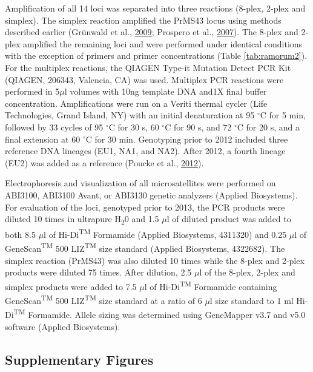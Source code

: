 \documentclass[double,12pt]{beavtex}
\begin{document}
  Amplification of all 14 loci was separated into three reactions (8-plex,
  2-plex and simplex). The simplex reaction amplified the PrMS43 locus
  using methods described earlier (Grünwald et al.,
  \protect\hyperlink{ref-grunwald2009standardizing}{2009}; Prospero et
  al., \protect\hyperlink{ref-prospero2007population}{2007}). The 8-plex
  and 2-plex amplified the remaining loci and were performed under
  identical conditions with the exception of primers and primer
  concentrations (Table \ref{tab:ramorum2}). For the multiplex reactions,
  the QIAGEN Type-it Mutation Detect PCR Kit (QIAGEN, 206343, Valencia,
  CA) was used. Multiplex PCR reactions were performed in 5\(\mu\)l
  volumes with 10ng template DNA and1X final buffer concentration.
  Amplifications were run on a Veriti thermal cycler (Life Technologies,
  Grand Island, NY) with an initial denaturation at 95 \(^{\circ}\)C for 5
  min, followed by 33 cycles of 95 \(^{\circ}\)C for 30 s, 60
  \(^{\circ}\)C for 90 s, and 72 \(^{\circ}\)C for 20 s, and a final
  extension at 60 \(^{\circ}\)C for 30 min. Genotyping prior to 2012
  included three reference DNA lineages (EU1, NA1, and NA2). After 2012, a
  fourth lineage (EU2) was added as a reference (Poucke et al.,
  \protect\hyperlink{ref-vanpoucke2012discovery}{2012}).
  
  Electrophoresis and visualization of all microsatellites were performed
  on ABI3100, ABI3100 Avant, or ABI3130 genetic analyzers (Applied
  Biosystems). For evaluation of the loci, genotyped prior to 2013, the
  PCR products were diluted 10 times in ultrapure H\textsubscript{2}0 and
  1.5 \(\mu\)l of diluted product was added to both 8.5 \(\mu\)l of
  Hi-Di\textsuperscript{TM} Formamide (Applied Biosystems, 4311320) and
  0.25 \(\mu\)l of GeneScan\textsuperscript{TM} 500
  LIZ\textsuperscript{TM} size standard (Applied Biosystems, 4322682). The
  simplex reaction (PrMS43) was also diluted 10 times while the 8-plex and
  2-plex products were diluted 75 times. After dilution, 2.5 \(\mu\)l of
  the 8-plex, 2-plex and simplex products were added to 7.5 \(\mu\)l of
  Hi-Di\textsuperscript{TM} Formamide containing
  GeneScan\textsuperscript{TM} 500 LIZ\textsuperscript{TM} size standard
  at a ratio of 6 \(\mu\)l size standard to 1 ml Hi-Di\textsuperscript{TM}
  Formamide. Allele sizing was determined using
  GeneMapper\textregistered{} v3.7 and v5.0 software (Applied Biosystems).
  
  \subsection{Supplementary Figures}\label{supplementary-figures}
  
\end{document}
